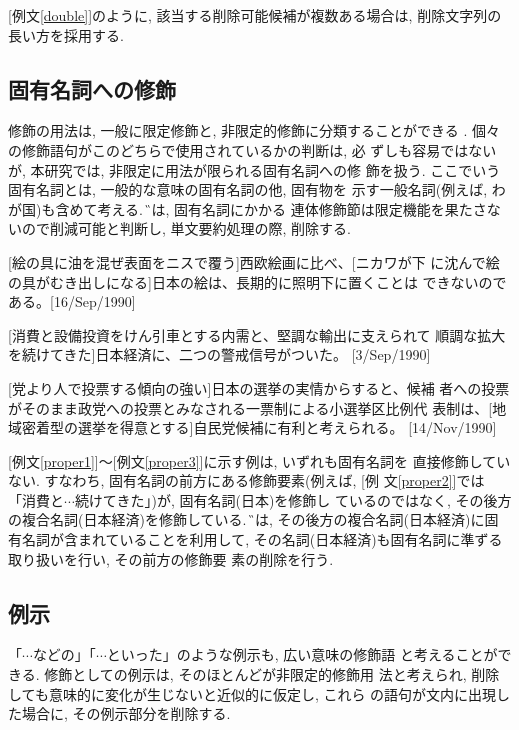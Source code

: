 [例文\ref{double}]のように, 該当する削除可能候補が複数ある場合は, 
削除文字列の長い方を採用する. 



\subsection{固有名詞への修飾}
修飾の用法は, 一般に限定修飾と, 非限定的修飾に分類することができる
\cite{寺村}. 個々の修飾語句がこのどちらで使用されているかの判断は, 必
ずしも容易ではないが, 本研究では, 非限定に用法が限られる固有名詞への修
飾を扱う. ここでいう固有名詞とは, 一般的な意味の固有名詞の他, 固有物を
示す一般名詞(例えば, わが国)も含めて考える.  \G では, 固有名詞にかかる
連体修飾節は限定機能を果たさないので削減可能と判断し, 単文要約処理の際, 
削除する. 

\begin{sample}
\item{ [絵の具に油を混ぜ表面をニスで覆う]西欧絵画に比べ、[ニカワが下
に沈んで絵の具がむき出しになる]日本の絵は、長期的に照明下に置くことは
できないのである。[16/Sep/1990]}\label{proper1}
\item{ [消費と設備投資をけん引車とする内需と、堅調な輸出に支えられて
順調な拡大を続けてきた]日本経済に、二つの警戒信号がついた。
[3/Sep/1990]}\label{proper2}
\item{[党より人で投票する傾向の強い]日本の選挙の実情からすると、候補
者への投票がそのまま政党への投票とみなされる一票制による小選挙区比例代
表制は、[地域密着型の選挙を得意とする]自民党候補に有利と考えられる。
[14/Nov/1990]}\label{proper3}
\end{sample}

[例文\ref{proper1}]〜[例文\ref{proper3}]に示す例は, いずれも固有名詞を
直接修飾していない. すなわち, 固有名詞の前方にある修飾要素(例えば, [例
文\ref{proper2}]では「消費と$\cdots$続けてきた」)が, 固有名詞(日本)を修飾し
ているのではなく, その後方の複合名詞(日本経済)を修飾している. \G 
では, その後方の複合名詞(日本経済)に固有名詞が含まれていることを利用して, 
その名詞(日本経済)も固有名詞に準ずる取り扱いを行い, その前方の修飾要
素の削除を行う. 

\subsection{例示}
「$\cdots$などの」「$\cdots$といった」のような例示も, 広い意味の修飾語
と考えることができる. 修飾としての例示は, そのほとんどが非限定的修飾用
法と考えられ, 削除しても意味的に変化が生じないと近似的に仮定し, これら
の語句が文内に出現した場合に, その例示部分を削除する. 


